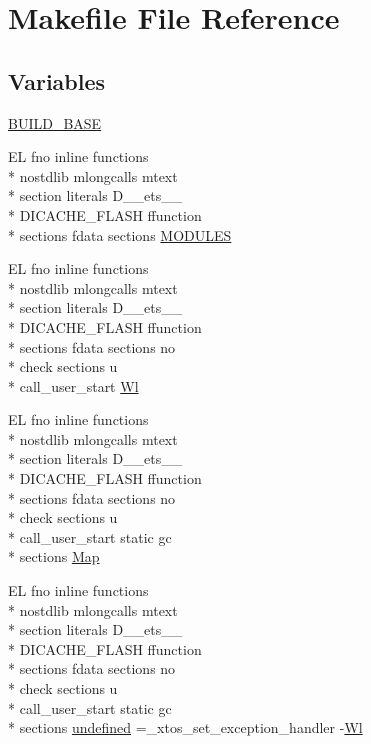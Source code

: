 \hypertarget{Makefile}{\section{Makefile File Reference}
\label{Makefile}
}
\subsection*{Variables}
\begin{DoxyCompactItemize}
\item 
\hyperlink{Makefile_aaa9bbf75d7f8fc94a5c7dd9504b7a178}{B\-U\-I\-L\-D\-\_\-\-B\-A\-S\-E}
\item 
E\-L fno inline functions \\*
nostdlib mlongcalls mtext \\*
section literals D\-\_\-\-\_\-ets\-\_\-\-\_\- \\*
D\-I\-C\-A\-C\-H\-E\-\_\-\-F\-L\-A\-S\-H ffunction \\*
sections fdata sections \hyperlink{Makefile_a61c8d9ae20beeb28ac4075403cc4ea41}{M\-O\-D\-U\-L\-E\-S}
\item 
E\-L fno inline functions \\*
nostdlib mlongcalls mtext \\*
section literals D\-\_\-\-\_\-ets\-\_\-\-\_\- \\*
D\-I\-C\-A\-C\-H\-E\-\_\-\-F\-L\-A\-S\-H ffunction \\*
sections fdata sections no \\*
check sections u \\*
call\-\_\-user\-\_\-start \hyperlink{Makefile_a1af3a6ecef406b93f1a1db145b2cfd43}{Wl}
\item 
E\-L fno inline functions \\*
nostdlib mlongcalls mtext \\*
section literals D\-\_\-\-\_\-ets\-\_\-\-\_\- \\*
D\-I\-C\-A\-C\-H\-E\-\_\-\-F\-L\-A\-S\-H ffunction \\*
sections fdata sections no \\*
check sections u \\*
call\-\_\-user\-\_\-start static gc \\*
sections \hyperlink{Makefile_a3d2682475b097eef42d87fa20f765794}{Map}
\item 
E\-L fno inline functions \\*
nostdlib mlongcalls mtext \\*
section literals D\-\_\-\-\_\-ets\-\_\-\-\_\- \\*
D\-I\-C\-A\-C\-H\-E\-\_\-\-F\-L\-A\-S\-H ffunction \\*
sections fdata sections no \\*
check sections u \\*
call\-\_\-user\-\_\-start static gc \\*
sections \hyperlink{Makefile_a7caa220288c6621dffebfc3a50a851e1}{undefined} =\-\_\-xtos\-\_\-set\-\_\-exception\-\_\-handler -\/\hyperlink{Makefile_a1af3a6ecef406b93f1a1db145b2cfd43}{Wl}
\end{DoxyCompactItemize}


